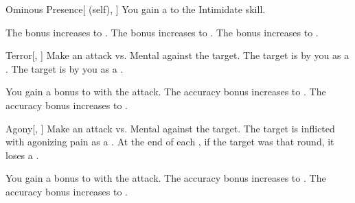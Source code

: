 \lowercase{\hypertarget{spell:Ominous Presence}{}}\label{spell:Ominous Presence}
\begin{attuneability}[Rank 1]{\hypertarget{spell:Ominous Presence}{Ominous Presence}}[ (self), ]
You gain a   to the Intimidate skill.

\rankline
{} The bonus increases to .
 The bonus increases to .
 The bonus increases to .

\end{attuneability}
\vspace{0.25em}



\lowercase{\hypertarget{spell:Terror}{}}\label{spell:Terror}
\begin{freeability}[Rank 1]{\hypertarget{spell:Terror}{Terror}}[, ]
Make an attack vs. Mental against the target.
\hit The target is \shaken by you as a .
\crit The target is  by you as a .

\rankline
{} You gain a  bonus to  with the attack.
 The accuracy bonus increases to .
 The accuracy bonus increases to .

\end{freeability}
\vspace{0.25em}



\lowercase{\hypertarget{spell:Agony}{}}\label{spell:Agony}
\begin{freeability}[Rank 2]{\hypertarget{spell:Agony}{Agony}}[, ]
Make an attack vs. Mental against the target.
\hit The target is inflicted with agonizing pain as a .
At the end of each , if the target was  that round, it loses a .

\rankline
{} You gain a  bonus to  with the attack.
 The accuracy bonus increases to .
 The accuracy bonus increases to .

\end{freeability}
\vspace{0.25em}




